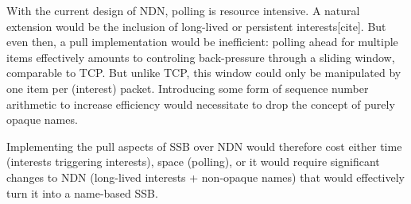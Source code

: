 \documentclass[9pt,sigconf]{acmart}
\begin{document}
With the current design of NDN, polling is resource intensive. A natural extension would be the inclusion of long-lived or persistent interests[cite]. But even then, a pull implementation would be inefficient: polling ahead for multiple items effectively amounts to controling back-pressure through a sliding window, comparable to TCP. But unlike TCP, this window could only be manipulated by one item per (interest) packet. Introducing some form of sequence number arithmetic to increase efficiency would necessitate to drop the concept of purely opaque names.

Implementing the pull aspects of SSB over NDN would therefore cost either time (interests triggering interests), space (polling), or it would require significant changes to NDN (long-lived interests + non-opaque names) that would effectively turn it into a name-based SSB.
\end{document}
